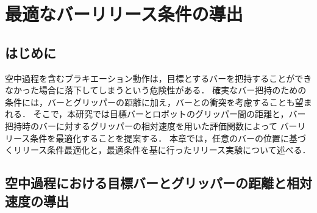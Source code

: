\chapter[最適なバーリリース条件の導出]%
{最適なバーリリース条件の導出}
        \section{はじめに}

        空中過程を含むブラキエーション動作は，目標とするバーを把持することができなかった場合に落下してしまうという危険性がある．
        確実なバー把持のための条件には，バーとグリッパーの距離に加え，バーとの衝突を考慮することも望まれる．
        そこで，本研究では目標バーとロボットのグリッパー間の距離と，バー把持時のバーに対するグリッパーの相対速度を用いた評価関数によって
        バーリリース条件を最適化することを提案する．
        本章では，任意のバーの位置に基づくリリース条件最適化と，最適条件を基に行ったリリース実験について述べる．

        \section{空中過程における目標バーとグリッパーの距離と相対速度の導出}
        
